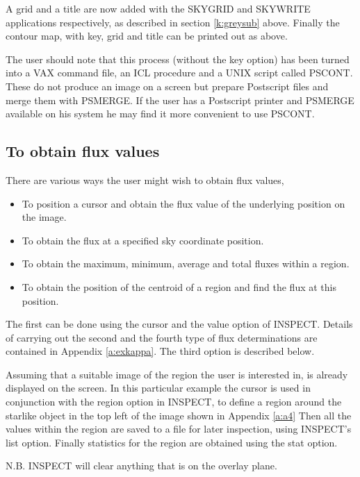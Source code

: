 \documentclass[twoside,11pt]{article}
\begin{document}
A grid and a title are now added with the SKYGRID and SKYWRITE applications
respectively, as described in section \ref {k:greysub} above. Finally the
contour map, with key, grid and title can be printed out as above.

The user should note that this process (without the key option) has been turned
into a VAX command file, an ICL procedure and a UNIX script called PSCONT.
These do not produce an image on a screen but prepare Postscript files and merge
them with PSMERGE. If the user has a Postscript printer and PSMERGE
available on his system he may find it more convenient to use PSCONT.

\subsection{To obtain flux values}
\label{k:flux}
There are various ways the user might wish to obtain flux values, 
\begin{itemize}
\item To position a cursor and obtain the flux value of the underlying 
position on the image.
\item To obtain the flux at a specified sky coordinate position.
\item To obtain the maximum, minimum, average and total fluxes within a region.
\item To obtain the position of the centroid of a region and find the flux at 
this position.
\end{itemize}
The first can be done using the cursor and the value option of INSPECT. Details
of carrying out the second and the fourth type of flux determinations are
contained in Appendix \ref{a:exkappa}. The third option is described below.

Assuming that a suitable image of the region the user is interested in, is 
already displayed on the screen. In this particular example the cursor is used
in conjunction with the region option in INSPECT, to define a region around
the starlike object in the top left of the image shown in Appendix \ref{a:a4}
Then all the values within the region are saved to a file for later inspection,
using INSPECT's list option. Finally statistics for the region are obtained
using the stat option.

N.B. INSPECT will clear anything that is on the overlay plane.
\end{document}

